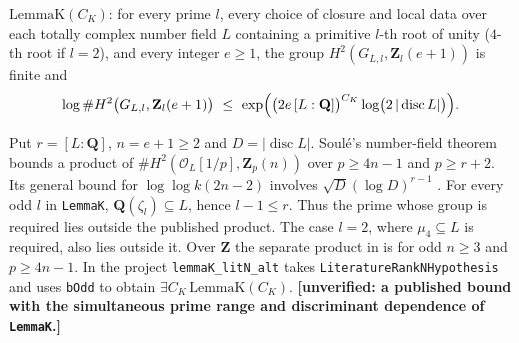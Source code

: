 \begin{definition}\label{def:S-lemmaK}
$\mathrm{LemmaK}(C_K)$: for every prime $l$, every choice of closure and local data over each totally complex number field $L$ containing a primitive
$l$-th root of unity ($4$-th root if $l=2$), and every integer $e\ge1$, the group $H^2(G_{L,l},\mathbf{Z}_l(e+1))$ is
finite and
\[
  \log\#H^2\bigl(G_{L,l},\mathbf{Z}_l(e+1)\bigr)\ \le\ \exp\Bigl(\bigl(2e\,[L:\mathbf{Q}]\bigr)^{C_K}\log\bigl(2\,|\operatorname{disc}L|\bigr)\Bigr).
\]
\end{definition}

\begin{remark}\label{rem:S-lemmaK}
Put $r=[L:\mathbf Q]$, $n=e+1\ge2$ and $D=|\operatorname{disc}L|$. Soul\'e's number-field
theorem bounds a product of $\#H^2(\mathcal O_L[1/p],\mathbf Z_p(n))$ over
$p\ge4n-1$ and $p\ge r+2$. Its general bound for $\log\log k(2n-2)$ involves
$\sqrt D(\log D)^{r-1}$ \cite[\S4.3, Theorem 3 and \S4.4, Proposition 4(i)]{S-SouleBound}.
For every odd $l$ in \texttt{LemmaK}, $\mathbf Q(\zeta_l)\subseteq L$, hence $l-1\le r$.
Thus the prime whose group is required lies outside the published product. The case $l=2$,
where $\mu_4\subseteq L$ is required, also lies outside it. Over $\mathbf Z$ the separate
product in \cite[Theorem 3]{S-SouleVandiver} is for odd $n\ge3$ and $p\ge4n-1$.
In the project \texttt{lemmaK\_litN\_alt} takes \texttt{LiteratureRankNHypothesis} and uses
\texttt{bOdd} to obtain $\exists C_K\,\mathrm{LemmaK}(C_K)$.
\textbf{[unverified: a published bound with the simultaneous prime range and discriminant dependence of \texttt{LemmaK}.]}
\end{remark}

